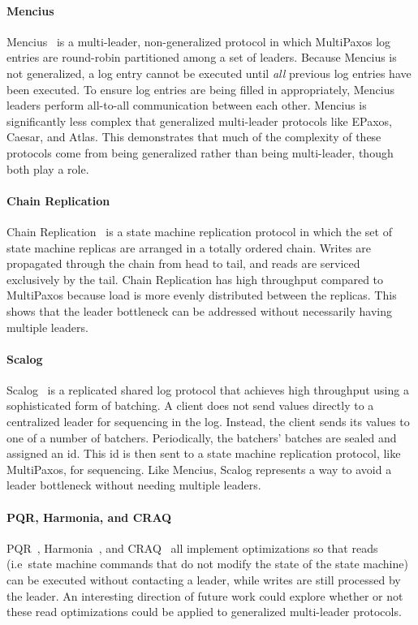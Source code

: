 \paragraph{Mencius}
Mencius~\cite{mao2008mencius} is a multi-leader, non-generalized protocol in
which MultiPaxos log entries are round-robin partitioned among a set of
leaders. Because Mencius is not generalized, a log entry cannot be executed
until \emph{all} previous log entries have been executed. To ensure log entries
are being filled in appropriately, Mencius leaders perform all-to-all
communication between each other. Mencius is significantly less complex that
generalized multi-leader protocols like EPaxos, Caesar, and Atlas. This
demonstrates that much of the complexity of these protocols come from being
generalized rather than being multi-leader, though both play a role.

\paragraph{Chain Replication}
Chain Replication~\cite{van2004chain} is a state machine replication protocol
in which the set of state machine replicas are arranged in a totally ordered
chain. Writes are propagated through the chain from head to tail, and reads are
serviced exclusively by the tail. Chain Replication has high throughput
compared to MultiPaxos because load is more evenly distributed between the
replicas. This shows that the leader bottleneck can be addressed without
necessarily having multiple leaders.

\paragraph{Scalog}
Scalog~\cite{ding2020scalog} is a replicated shared log protocol that achieves
high throughput using a sophisticated form of batching. A client does not send
values directly to a centralized leader for sequencing in the log. Instead, the
client sends its values to one of a number of batchers. Periodically, the
batchers' batches are sealed and assigned an id. This id is then sent to a
state machine replication protocol, like MultiPaxos, for sequencing. Like
Mencius, Scalog represents a way to avoid a leader bottleneck without needing
multiple leaders.

\paragraph{PQR, Harmonia, and CRAQ}
PQR~\cite{charapko2019linearizable}, Harmonia~\cite{zhu2019harmonia}, and
CRAQ~\cite{terrace2009object} all implement optimizations so that reads (i.e\
state machine commands that do not modify the state of the state machine) can
be executed without contacting a leader, while writes are still processed by
the leader. An interesting direction of future work could explore whether or
not these read optimizations could be applied to generalized multi-leader
protocols.
